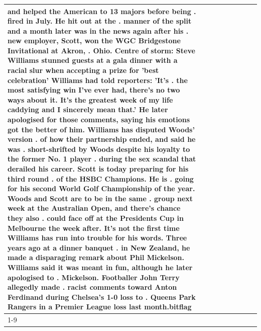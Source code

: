 \begin{table}[H]
\begin{tabular}{lllrlllll}
and helped the American to 13 majors before being . fired in July. He hit out at the . manner of the split and a month later was in the news again after his . new employer, Scott, won the WGC Bridgestone Invitational at Akron, . Ohio. Centre of storm: Steve Williams stunned guests at a gala dinner with a racial slur when accepting a prize for 'best celebration' Williams had told reporters: 'It's . the most satisfying win I've ever had, there's no two ways about it. It's the greatest week of my life caddying and I sincerely mean that.' He later apologised for those comments, saying his emotions got the better of him. Williams has disputed Woods' version . of how their partnership ended, and said he was . short-shrifted by Woods despite his loyalty to the former No. 1 player . during the sex scandal that derailed his career. Scott is today preparing for his third round . of the HSBC Champions. He is . going for his second World Golf Championship of the year. Woods and Scott are to be in the same . group next week at the Australian Open, and there's chance they also . could face off at the Presidents Cup in Melbourne the week after. It's not the first time Williams has run into trouble for his words. Three years ago at a dinner banquet . in New Zealand, he made a disparaging remark about Phil Mickelson. Williams said it was meant in fun, although he later apologised to . Mickelson. Footballer John Terry allegedly made . racist comments toward Anton Ferdinand during Chelsea's 1-0 loss to . Queens Park Rangers in a Premier League loss last month.bitflag \\
\cline{1-9}

\end{tabular}
\end{table}
